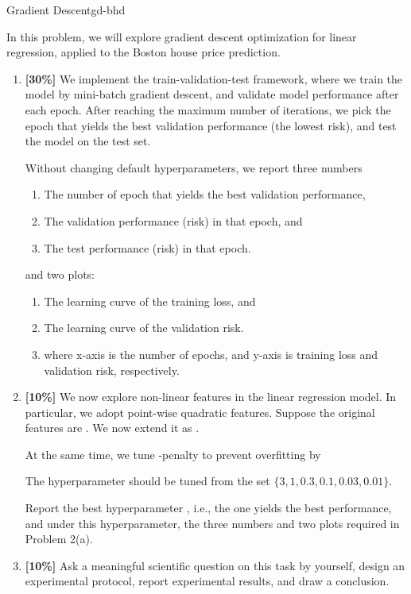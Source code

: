 \begin{problem}{Gradient Descent}{gd-bhd}

In this problem, we will explore gradient descent optimization for linear regression, applied to the Boston house price prediction.

\begin{enumerate}
  \item \textbf{[30\%]} We implement the train-validation-test framework, where we train the model by mini-batch gradient descent, and validate model performance after each epoch. After reaching the maximum number of iterations, we pick the epoch that yields the best validation performance (the lowest risk), and test the model on the test set. 

Without changing default hyperparameters, we report three numbers 
  \begin{enumerate}
    \item The number of epoch that yields the best validation performance,
    \item The validation performance (risk) in that epoch, and
    \item The test performance (risk) in that epoch. 
  \end{enumerate}
and two plots:
  \begin{enumerate}
    \item The learning curve of the training loss, and
    \item The learning curve of the validation risk. 
    \item where x-axis is the number of epochs, and y-axis is training loss and validation risk, respectively. 
  \end{enumerate}

  \item \textbf{[10\%]} We now explore non-linear features in the linear regression model. In particular, we adopt point-wise quadratic features. Suppose the original features are . We now extend it as . 

At the same time, we tune -penalty to prevent overfitting by 
	
The hyperparameter  should be tuned from the set $\{3, 1, 0.3, 0.1, 0.03, 0.01\}$.

Report the best hyperparameter , i.e., the one yields the best performance, and under this hyperparameter, the three numbers and two plots required in Problem 2(a).

  \item \textbf{[10\%]} Ask a meaningful scientific question on this task by yourself, design an experimental protocol, report experimental results, and draw a conclusion.
\end{enumerate}
\end{problem}










